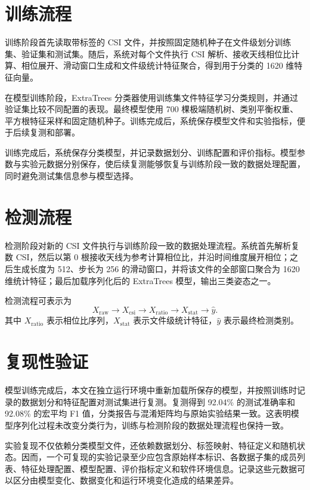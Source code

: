 \section{训练流程}
训练阶段首先读取带标签的 CSI 文件，并按照固定随机种子在文件级划分训练集、验证集和测试集。随后，系统对每个文件执行 CSI 解析、接收天线相位比计算、相位展开、滑动窗口生成和文件级统计特征聚合，得到用于分类的 1620 维特征向量。

在模型训练阶段，ExtraTrees 分类器使用训练集文件特征学习分类规则，并通过验证集比较不同配置的表现。最终模型使用 700 棵极端随机树、类别平衡权重、平方根特征采样和固定随机种子。训练完成后，系统保存模型文件和实验指标，便于后续复测和部署。

训练完成后，系统保存分类模型，并记录数据划分、训练配置和评价指标。模型参数与实验元数据分别保存，使后续复测能够恢复与训练阶段一致的数据处理配置，同时避免测试集信息参与模型选择。

\section{检测流程}
检测阶段对新的 CSI 文件执行与训练阶段一致的数据处理流程。系统首先解析复数 CSI，然后以第 0 根接收天线为参考计算相位比，并沿时间维度展开相位；之后生成长度为 512、步长为 256 的滑动窗口，并将该文件的全部窗口聚合为 1620 维统计特征；最后加载序列化后的 ExtraTrees 模型，输出三类姿态之一。

检测流程可表示为
\begin{equation}
X_{\mathrm{raw}}\rightarrow X_{\mathrm{csi}}\rightarrow X_{\mathrm{ratio}}\rightarrow X_{\mathrm{stat}}\rightarrow \hat{y}.
\end{equation}
其中 $X_{\mathrm{ratio}}$ 表示相位比序列，$X_{\mathrm{stat}}$ 表示文件级统计特征，$\hat{y}$ 表示最终检测类别。

\section{复现性验证}
模型训练完成后，本文在独立运行环境中重新加载所保存的模型，并按照训练时记录的数据划分和特征配置对测试集进行复测。复测得到 92.04\% 的测试准确率和 92.08\% 的宏平均 F1 值，分类报告与混淆矩阵均与原始实验结果一致。这表明模型序列化过程未改变分类行为，训练与检测阶段的数据处理流程也保持一致。

实验复现不仅依赖分类模型文件，还依赖数据划分、标签映射、特征定义和随机状态。因而，一个可复现的实验记录至少应包含原始样本标识、各数据子集的成员列表、特征处理配置、模型配置、评价指标定义和软件环境信息。记录这些元数据可以区分由模型变化、数据变化和运行环境变化造成的结果差异。

